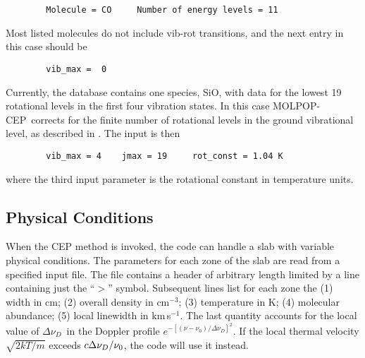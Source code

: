\documentclass[12pt]{article}
\def\separation {0.5cm}
\def\DnuD     {\hbox{$\Delta\nu_D$}}
\def\M{MOLPOP-CEP}
\begin{document}
\vspace{\separation}
\begin{verbatim}
        Molecule = CO     Number of energy levels = 11
\end{verbatim}
Most listed molecules do not include vib-rot transitions, and the next entry in
this case should be

\vspace{\separation}
\begin{verbatim}
        vib_max =  0
\end{verbatim}
Currently, the database contains one species, SiO, with data for the lowest 19
rotational levels in the first four vibration states. In this case \M\ corrects
for the finite number of rotational levels in the ground vibrational level, as
described in \cite{lockett_elitzur92}.  The input is then

\vspace{\separation}
\begin{verbatim}
        vib_max = 4    jmax = 19     rot_const = 1.04 K
\end{verbatim}
where the third input parameter is the rotational constant in temperature
units.

\subsection{Physical Conditions}
\label{sec:physical}

When the CEP method is invoked, the code can handle a slab with variable
physical conditions. The parameters for each zone of the slab are read from a
specified input file. The file contains a header of arbitrary length limited by
a line containing just the ``\texttt{$>$}'' symbol. Subsequent lines list for
each zone the (1) width in cm; (2) overall density in cm$^{-3}$; (3)
temperature in K; (4) molecular abundance; (5) local linewidth in km\,s$^{-1}$.
The last quantity accounts for the local value of \DnuD\ in the Doppler profile
$e^{-[(\nu - \nu_0)/\Delta \nu_D]^2}$. If the local thermal velocity
$\sqrt{2kT/m}$ exceeds $c\DnuD/\nu_0$, the code will use it instead.
\end{document}
